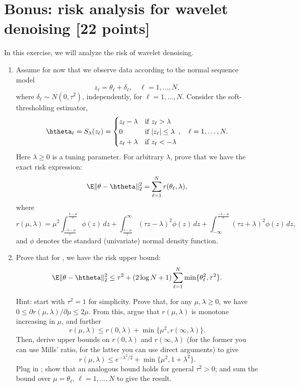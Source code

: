 \documentclass{article}
\begin{document}
\section{Bonus: risk analysis for wavelet denoising [22 points]}

\def\ttheta{\tilde\theta}
\def\TV{\mathrm{TV}}

In this exercise, we will analyze the risk of wavelet denoising. 

\begin{enumerate}[label=(\alph*)]
\item Assume for now that we observe data according to the normal sequence model  
  \begin{equation}
  \label{eq:sequence_model}
  z_\ell = \theta_\ell + \delta_\ell, \quad \ell=1,\dots,N,  
  \end{equation}
  where $\delta_\ell \sim N(0,\tau^2)$, independently, for
  $\ell=1,\dots,N$. Consider the soft-thresholding estimator,
  \[
  \htheta_\ell = S_\lambda(z_\ell) 
  = \begin{cases}
    z_\ell-\lambda & \text{if $z_\ell > \lambda$} \\
    0 & \text{if $|z_\ell| \leq \lambda$} \\
    z_\ell+\lambda & \text{if $z_\ell < -\lambda$}
  \end{cases}, 
  \quad \ell=1,\dots,N.
  \]
  Here $\lambda \geq 0$ is a tuning parameter. For arbitrary $\lambda$, prove
  that we have the exact risk expression:
  \marginpar{\small [3 pts]}
  \[
  \E \|\theta - \htheta\|_2^2 = \sum_{\ell=1}^N r(\theta_\ell, \lambda),   
  \]
  where
  \[
    r(\mu,\lambda) = \mu^2
    \int_{\frac{-\lambda-\mu}{\tau}}^{\frac{\lambda-\mu}{\tau}} \phi(z) \, dz +  
    \int_{\frac{\lambda-\mu}{\tau}}^\infty (\tau z- \lambda)^2 \phi(z) \, dz + 
    \int_{-\infty}^{\frac{-\lambda-\mu}{\tau}} (\tau z + \lambda)^2 \phi(z) \,
    dz, 
  \]
    and $\phi$ denotes the standard (univariate) normal density function. 

  \item Prove that for , we have the risk
    upper bound: 
  \marginpar{\small [5 pts]}
  \[
    \E \|\theta - \htheta\|_2^2 \leq \tau^2 + (2\log{N}+1) \sum_{\ell=1}^N
    \min\{\theta_\ell^2, \tau^2\}.    
  \]

  Hint: start with $\tau^2=1$ for simplicity. Prove that, for any $\mu,\lambda
  \geq 0$, we have $0 \leq \partial r(\mu,\lambda) / \partial \mu \leq
  2\mu$. From this, argue that $r(\mu,\lambda)$ is monotone increasing in $\mu$,
  and further    
  \[
  r(\mu,\lambda) \leq r(0,\lambda) + \min\{\mu^2, r(\infty,\lambda)\}.  
  \]
  Then, derive upper bounds on $r(0,\lambda)$ and $r(\infty,\lambda)$ (for the
  former you can use Mills' ratio, for the latter you can use direct arguments)
  to give     
  \[
  r(\mu,\lambda) \leq e^{-\lambda^2/2} + \min\{\mu^2,1+\lambda^2\}.  
  \]
  Plug in ; show that an analogous bound
  holds for general $\tau^2>0$; and sum the bound over $\mu = \theta_\ell$,
  $\ell=1,\ldots,N$ to give the result.    


\end{enumerate}
\end{document}
